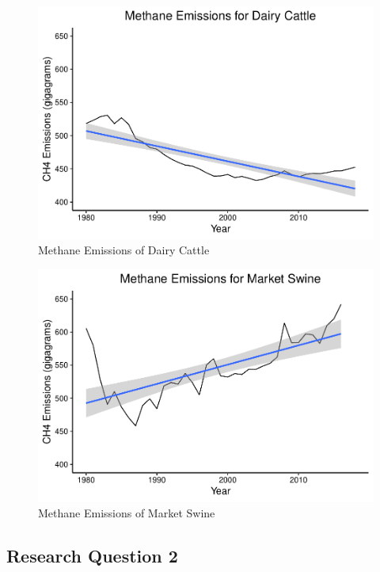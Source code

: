 \documentclass[
  12pt,
]{article}
\begin{document}
\begin{figure}
\centering
\includegraphics{SultzerSwitFinalProject_files/figure-latex/dairy.cattle.ts-1.pdf}
\caption{Methane Emissions of Dairy Cattle}
\end{figure}

\begin{figure}
\centering
\includegraphics{SultzerSwitFinalProject_files/figure-latex/market.swine.ts-1.pdf}
\caption{Methane Emissions of Market Swine}
\end{figure}

\hypertarget{research-question-2}{%
\subsection{Research Question 2}\label{research-question-2}}
\end{document}

